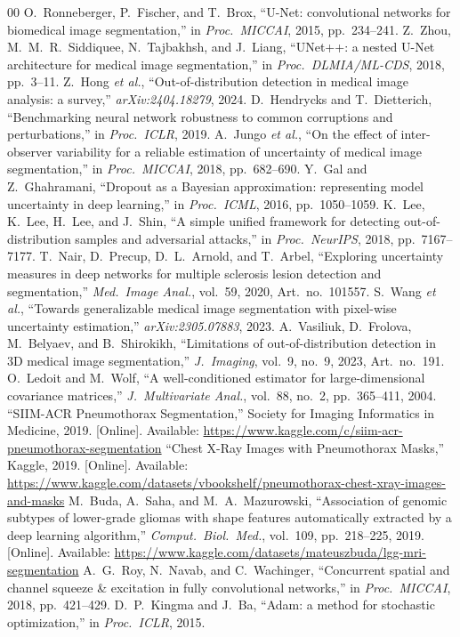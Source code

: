 \documentclass[a4paper,conference]{IEEEtran}
\begin{document}
\begin{thebibliography}{00}
 O.~Ronneberger, P.~Fischer, and T.~Brox, ``U-Net: convolutional networks for biomedical image segmentation,'' in \emph{Proc.\ MICCAI}, 2015, pp.~234--241.
 Z.~Zhou, M.~M.~R.~Siddiquee, N.~Tajbakhsh, and J.~Liang, ``UNet++: a nested U-Net architecture for medical image segmentation,'' in \emph{Proc.\ DLMIA/ML-CDS}, 2018, pp.~3--11.
 Z.~Hong \emph{et al.}, ``Out-of-distribution detection in medical image analysis: a survey,'' \emph{arXiv:2404.18279}, 2024.
 D.~Hendrycks and T.~Dietterich, ``Benchmarking neural network robustness to common corruptions and perturbations,'' in \emph{Proc.\ ICLR}, 2019.
 A.~Jungo \emph{et al.}, ``On the effect of inter-observer variability for a reliable estimation of uncertainty of medical image segmentation,'' in \emph{Proc.\ MICCAI}, 2018, pp.~682--690.
 Y.~Gal and Z.~Ghahramani, ``Dropout as a Bayesian approximation: representing model uncertainty in deep learning,'' in \emph{Proc.\ ICML}, 2016, pp.~1050--1059.
 K.~Lee, K.~Lee, H.~Lee, and J.~Shin, ``A simple unified framework for detecting out-of-distribution samples and adversarial attacks,'' in \emph{Proc.\ NeurIPS}, 2018, pp.~7167--7177.
 T.~Nair, D.~Precup, D.~L.~Arnold, and T.~Arbel, ``Exploring uncertainty measures in deep networks for multiple sclerosis lesion detection and segmentation,'' \emph{Med.\ Image Anal.}, vol.~59, 2020, Art.~no.~101557.
 S.~Wang \emph{et al.}, ``Towards generalizable medical image segmentation with pixel-wise uncertainty estimation,'' \emph{arXiv:2305.07883}, 2023.
 A.~Vasiliuk, D.~Frolova, M.~Belyaev, and B.~Shirokikh, ``Limitations of out-of-distribution detection in 3D medical image segmentation,'' \emph{J.\ Imaging}, vol.~9, no.~9, 2023, Art.~no.~191.
 O.~Ledoit and M.~Wolf, ``A well-conditioned estimator for large-dimensional covariance matrices,'' \emph{J.\ Multivariate Anal.}, vol.~88, no.~2, pp.~365--411, 2004.
 ``SIIM-ACR Pneumothorax Segmentation,'' Society for Imaging Informatics in Medicine, 2019. [Online]. Available: \url{https://www.kaggle.com/c/siim-acr-pneumothorax-segmentation}
 ``Chest X-Ray Images with Pneumothorax Masks,'' Kaggle, 2019. [Online]. Available: \url{https://www.kaggle.com/datasets/vbookshelf/pneumothorax-chest-xray-images-and-masks}
 M.~Buda, A.~Saha, and M.~A.~Mazurowski, ``Association of genomic subtypes of lower-grade gliomas with shape features automatically extracted by a deep learning algorithm,'' \emph{Comput.\ Biol.\ Med.}, vol.~109, pp.~218--225, 2019. [Online]. Available: \url{https://www.kaggle.com/datasets/mateuszbuda/lgg-mri-segmentation}
 A.~G.~Roy, N.~Navab, and C.~Wachinger, ``Concurrent spatial and channel squeeze \& excitation in fully convolutional networks,'' in \emph{Proc.\ MICCAI}, 2018, pp.~421--429.
 D.~P.~Kingma and J.~Ba, ``Adam: a method for stochastic optimization,'' in \emph{Proc.\ ICLR}, 2015.
\end{thebibliography}
\end{document}
